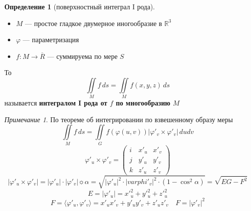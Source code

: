 \documentclass[english]{article}
\newcommand{\R}{\mathbb{R}}
\theoremstyle{plain}
\theoremstyle{remark}
\newtheorem*{remark}{Примечание}
\theoremstyle{definition}
\newtheorem*{definition}{Определение}
\begin{document}
\begin{definition}[поверхностный интеграл I рода]
\-
\begin{itemize}
\item \(M\) --- простое гладкое двумерное иногообразие в \(\R^3\)
\item \(\varphi\) --- параметризация
\item \(f: M \to \overline{R}\) --- суммируема по мере \(S\)
\end{itemize}
То \[ \iint\limits_M f\,ds = \iint\limits_M f(x, y, z)\,ds \]
называется \textbf{интегралом I рода от \(f\) по многообразию \(M\)}
\end{definition}
\begin{remark}
По теореме об интегрировании по взвешенному образу меры
\[ \iint\limits_M f\,ds = \iint\limits_G f(\varphi(u, v)) |\varphi'_v \times \varphi'_v|\,dudv \]
\[ \varphi'_u \times \varphi'_v = \begin{pmatrix}
i & x'_u & x'_v \\
j & y'_u & y'_v \\
k & z'_u & z'_v
\end{pmatrix}\]
\[ |\varphi'_u \times \varphi'_v| = |\varphi'_u| \cdot |\varphi'_v|\sun\alpha = \sqrt{|\varphi'_u|^2 \cdot |varphi'_v|^2 \cdot (1 - \cos^2\alpha)} = \sqrt{EG - F^2} \]
\[ E = |\varphi'_u| = x'_u^2 + y'_u^2 + z'_u^2 \]
\[ F = \langle \varphi'_u, \varphi'_v \rangle = x'_ux'_v + y'_uy'_v + z'_u z'_v \quad F = |\varphi'_v|^2 \]
\end{remark}
\end{document}
